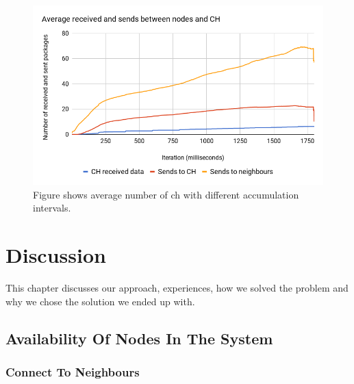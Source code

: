 \documentclass[USenglish]{uit-thesis}
\begin{document}
\begin{figure} [ht]
\centering
\includegraphics[width=\textwidth]{sentVsRecvChart.png}
\caption{Figure shows average number of \gls{ch} with different accumulation intervals.}
\label{fig:sentvsrecvChart}
\end{figure}




\chapter{Discussion}
\glsresetall

This chapter discusses our approach, experiences, how we solved the problem and why we chose the solution we ended up with.

\section{Availability Of Nodes In The System} \label{disc:node_conn}

\subsection{Connect To Neighbours} \label{disc:conn_neighbours}

\end{document}
